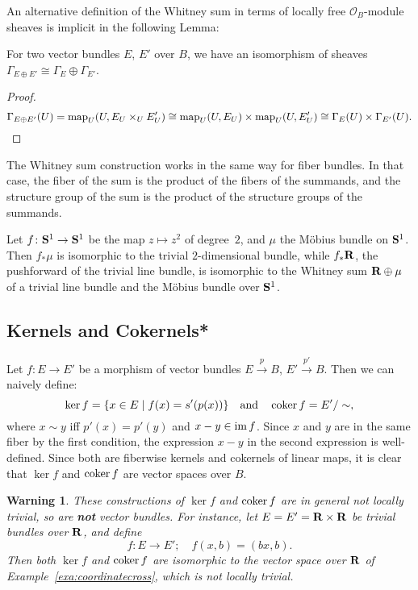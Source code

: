 \documentclass[a4paper,openany]{scrbook}
\newtheorem{warning}[equation]{Warning}
\begin{document}
An alternative definition of the Whitney sum in terms of locally free $\mathcal O_B$-module sheaves is implicit in the following Lemma:

\begin{lemma}
For two vector bundles $E$, $E'$ over $B$, we have an isomorphism of sheaves $\Gamma_{E \oplus E'} \cong \Gamma_E \oplus \Gamma_{E'}$.
\end{lemma}
\begin{proof}
\[
\Gamma_{E \oplus E'}(U) = \map_U(U,E_U \times_U E'_U) \cong \map_U(U,E_U) \times \map_U(U,E'_U) \cong \Gamma_E(U) \times \Gamma_{E'}(U).
\]
\end{proof}

The Whitney sum construction works in the same way for fiber bundles. In that case, the fiber of the sum is the product of the fibers of the summands, and the structure group of the sum is the product of the structure groups of the summands.

\begin{exer}
Let $f\colon \S^1 \to \S^1$ be the map $z \mapsto z^2$ of degree~$2$, and $\mu$ the Möbius bundle on $\S^1$. Then $f_*\mu$ is isomorphic to the trivial $2$-dimensional bundle, while $f_*\R$, the pushforward of the trivial line bundle, is isomorphic to the Whitney sum $\R \oplus \mu$ of a trivial line bundle and the Möbius bundle over $\S^1$.
\end{exer}

\subsection{Kernels and Cokernels*}

Let $f\colon E \to E'$ be a morphism of vector bundles $E \xrightarrow{p} B$, $E' \xrightarrow{p'} B$. Then we can naively define:
\[
\ker f = \{x \in E \mid f(x)=s'(p(x))\} \quad \text{and} \quad \coker f = E'/\sim,
\]
where $x \sim y$ iff $p'(x) = p'(y)$ and $x-y \in \im f$. Since $x$ and $y$ are in the same fiber by the first condition, the expression $x-y$ in the second expression is well-defined. Since both are fiberwise kernels and cokernels of linear maps, it is clear that $\ker f$ and $\coker f$ are vector spaces over $B$.

\begin{warning}
These constructions of $\ker f$ and $\coker f$ are in general not locally trivial, so are \textbf{not} vector bundles. For instance, let $E=E'=\R\times \R$ be trivial bundles over $\R$, and define
\[
f\colon E \to E'; \quad f(x,b) = (bx,b).
\]
Then both $\ker f$ and $\coker f$ are isomorphic to the vector space over $\R$ of Example~\ref{exa:coordinatecross}, which is not locally trivial.
\end{warning}
\end{document}
